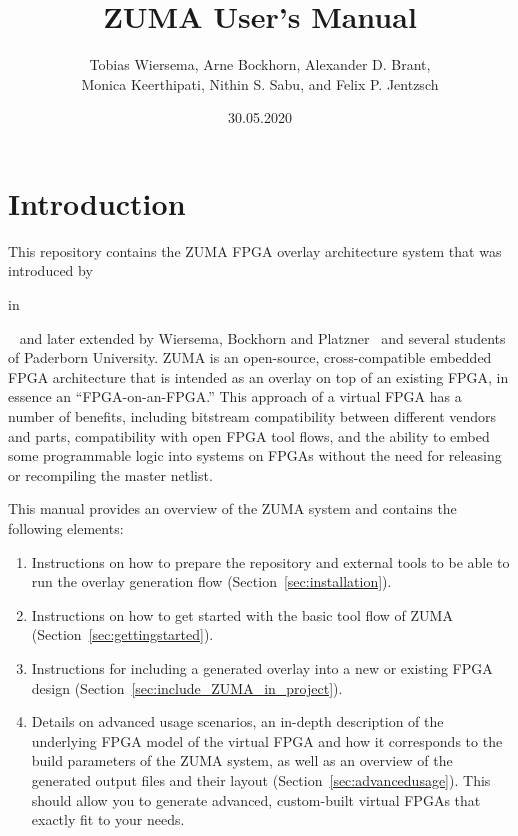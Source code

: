 \documentclass{article}
\begin{document}
\title{ZUMA User's Manual}
\author{Tobias Wiersema, Arne Bockhorn, Alexander D. Brant,\\ Monica Keerthipati, Nithin S. Sabu, and Felix P. Jentzsch}
\date{30.05.2020}
\maketitle
\tableofcontents

\section{Introduction}
This repository contains the ZUMA FPGA overlay architecture system that was introduced by
\begin{NoHyper}\citeauthor{brantlemieux2012ZUMA} in \citeyear{brantlemieux2012ZUMA}\end{NoHyper}~\cite{brantlemieux2012ZUMA,brant2013MT} and later extended by Wiersema, Bockhorn and Platzner~\cite{wiersemaBP2014ZUMAReconOS,wiersemaBP2016ZUMAReconOS} and several students of Paderborn University.
ZUMA is an open-source, cross-compatible embedded FPGA architecture that is intended as an overlay on top of an existing FPGA, in essence an ``FPGA-on-an-FPGA.''
This approach of a virtual FPGA has a number of benefits, including bitstream compatibility between different vendors and parts, compatibility with open FPGA tool flows, and the ability to embed some programmable logic into systems on FPGAs without the need for releasing or recompiling the master netlist.

This manual provides an overview of the ZUMA system and contains the following elements:
\begin{enumerate}
    \item Instructions on how to prepare the repository  and external tools to be able to run the overlay generation flow (Section~\ref{sec:installation}).
    \item Instructions on how to get started with the basic tool flow of ZUMA (Section~\ref{sec:gettingstarted}).
    \item Instructions for including a generated overlay into a new or existing FPGA design (Section~\ref{sec:include_ZUMA_in_project}).
    \item Details on advanced usage scenarios, an in-depth description of the underlying FPGA model of the virtual FPGA and how it corresponds to the build parameters of the ZUMA system, as well as an overview of the generated output files and their layout (Section~\ref{sec:advancedusage}).
    This should allow you to generate advanced, custom-built virtual FPGAs that exactly fit to your needs.
\end{enumerate}
\end{document}
